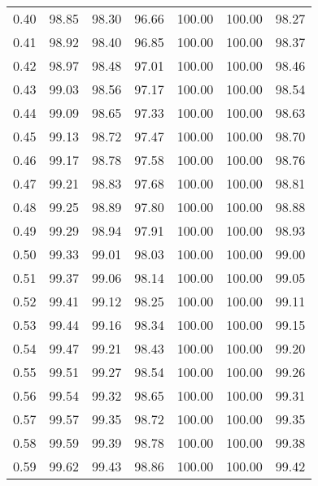 \begin{tabular}{|c|c|c|c|c|c|c|}
      0.40 &     98.85 &     98.30 &      96.66 &  100.00 &     100.00 &         98.27 \\
      0.41 &     98.92 &     98.40 &      96.85 &  100.00 &     100.00 &         98.37 \\
      0.42 &     98.97 &     98.48 &      97.01 &  100.00 &     100.00 &         98.46 \\
      0.43 &     99.03 &     98.56 &      97.17 &  100.00 &     100.00 &         98.54 \\
      0.44 &     99.09 &     98.65 &      97.33 &  100.00 &     100.00 &         98.63 \\
      0.45 &     99.13 &     98.72 &      97.47 &  100.00 &     100.00 &         98.70 \\
      0.46 &     99.17 &     98.78 &      97.58 &  100.00 &     100.00 &         98.76 \\
      0.47 &     99.21 &     98.83 &      97.68 &  100.00 &     100.00 &         98.81 \\
      0.48 &     99.25 &     98.89 &      97.80 &  100.00 &     100.00 &         98.88 \\
      0.49 &     99.29 &     98.94 &      97.91 &  100.00 &     100.00 &         98.93 \\
      0.50 &     99.33 &     99.01 &      98.03 &  100.00 &     100.00 &         99.00 \\
      0.51 &     99.37 &     99.06 &      98.14 &  100.00 &     100.00 &         99.05 \\
      0.52 &     99.41 &     99.12 &      98.25 &  100.00 &     100.00 &         99.11 \\
      0.53 &     99.44 &     99.16 &      98.34 &  100.00 &     100.00 &         99.15 \\
      0.54 &     99.47 &     99.21 &      98.43 &  100.00 &     100.00 &         99.20 \\
      0.55 &     99.51 &     99.27 &      98.54 &  100.00 &     100.00 &         99.26 \\
      0.56 &     99.54 &     99.32 &      98.65 &  100.00 &     100.00 &         99.31 \\
      0.57 &     99.57 &     99.35 &      98.72 &  100.00 &     100.00 &         99.35 \\
      0.58 &     99.59 &     99.39 &      98.78 &  100.00 &     100.00 &         99.38 \\
      0.59 &     99.62 &     99.43 &      98.86 &  100.00 &     100.00 &         99.42 \\

\end{tabular}
